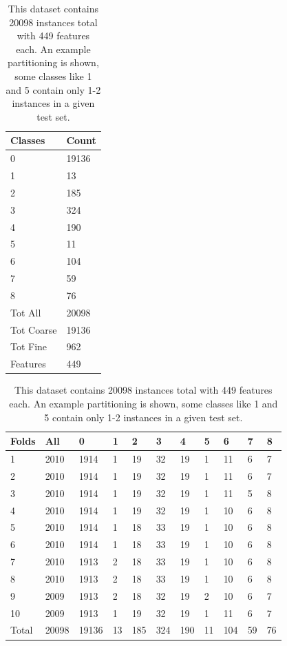\documentclass[ms]{nuthesis}
\begin{document}
\FloatBarrier
\begin{table}[!htb]
\centering
\begin{subtable}{.25\linewidth}
  \centering
  \begin{tabular}{|l||l|}\toprule
    Classes & Count \\ \midrule
    0 & 19136 \\
    1 & 13 \\
    2 & 185 \\
    3 & 324 \\
    4 & 190 \\
    5 & 11 \\
    6 & 104 \\
    7 & 59 \\
    8 & 76 \\ \midrule
    Tot All & 20098 \\
    Tot Coarse & 19136 \\
    Tot Fine & 962 \\
    Features & 449 \\ \bottomrule
  \end{tabular}
  \caption{Classes}
  \label{tab:ClassesAll}
\end{subtable}%
\begin{subtable}{.75\linewidth}
\centering
  \begin{tabular}{|l||l||l||l||l||l||l||l||l||l||l|}\toprule
    Folds & All & 0 & 1 & 2 & 3 & 4 & 5 & 6 & 7 & 8 \\ \midrule
    1 & 2010 & 1914 & 1 & 19 & 32 & 19 & 1 & 11 & 6 & 7 \\
    2 & 2010 & 1914 & 1 & 19 & 32 & 19 & 1 & 11 & 6 & 7 \\
    3 & 2010 & 1914 & 1 & 19 & 32 & 19 & 1 & 11 & 5 & 8 \\
    4 & 2010 & 1914 & 1 & 19 & 32 & 19 & 1 & 10 & 6 & 8 \\
    5 & 2010 & 1914 & 1 & 18 & 33 & 19 & 1 & 10 & 6 & 8 \\
    6 & 2010 & 1914 & 1 & 18 & 33 & 19 & 1 & 10 & 6 & 8 \\
    7 & 2010 & 1913 & 2 & 18 & 33 & 19 & 1 & 10 & 6 & 8 \\
    8 & 2010 & 1913 & 2 & 18 & 33 & 19 & 1 & 10 & 6 & 8 \\
    9 & 2009 & 1913 & 2 & 18 & 32 & 19 & 2 & 10 & 6 & 7 \\
    10 & 2009 & 1913 & 1 & 19 & 32 & 19 & 1 & 11 & 6 & 7 \\ \midrule
    Total & 20098 & 19136 & 13 & 185 & 324 & 190 & 11 & 104 & 59 & 76 \\
 \bottomrule
  \end{tabular}
  \caption{Folds}
  \label{tab:partitions}
  \end{subtable}
  \caption{This dataset contains 20098 instances total with 449 features each. An example partitioning is shown, some classes
  like 1 and 5 contain only 1-2 instances in a given test set.}
  \label{tab:dataset}
\end{table}
\FloatBarrier
\end{document}
